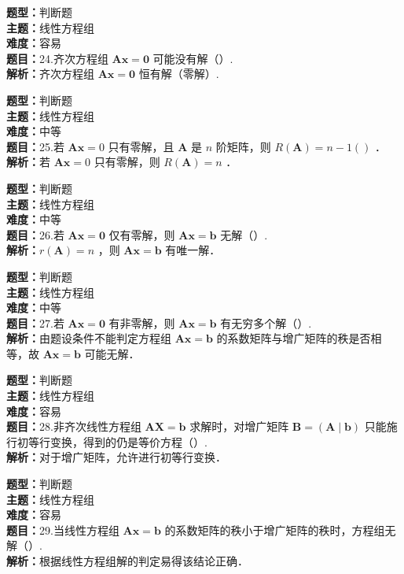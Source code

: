 \documentclass{ctexart}
\newenvironment{question}[5]{%
	\noindent\textbf{题型：}#1\\
	\textbf{主题：}#2\\
	\textbf{难度：}#3\\
	\textbf{题目：}#4\\
	\textbf{解析：}#5\\
	\vspace{1em}
}{}
\begin{document}
	\begin{question}
		{判断题}
		{线性方程组}
		{容易}
		{24.齐次方程组 \(\mathbf{Ax}=\mathbf{0}\) 可能没有解（）. }
		{齐次方程组 \(\mathbf{Ax}=\mathbf{0}\) 恒有解（零解）. }
	\end{question}
	
	\begin{question}
		{判断题}
		{线性方程组}
		{中等}
		{25.若 \(\mathbf{Ax}=0\) 只有零解，且 \(\mathbf{A}\) 是 \(n\) 阶矩阵，则 \(R(\mathbf{A})=n-1()\) ．}
		{若 \(\mathbf{Ax}=0\) 只有零解，则 \(R(\mathbf{A})=n\) ．}
	\end{question}
	
	\begin{question}
		{判断题}
		{线性方程组}
		{中等}
		{26.若 \(\mathbf{Ax}=\mathbf{0}\) 仅有零解，则 \(\mathbf{Ax}=\mathbf{b}\) 无解（）. }
		{\(r(\mathbf{A})=n\) ，则 \(\mathbf{Ax}=\mathbf{b}\) 有唯一解．}
	\end{question}
	
	
	\begin{question}
		{判断题}
		{线性方程组}
		{中等}
		{27.若 \(\mathbf{A x}=\mathbf{0}\) 有非零解，则 \(\mathbf{A x}=\mathbf{b}\) 有无穷多个解（）. }
		{由题设条件不能判定方程组 \(\mathbf{A x}=\mathbf{b}\) 的系数矩阵与增广矩阵的秩是否相等，故 \(\mathbf{A x}=\mathbf{b}\) 可能无解．}
	\end{question}
	
	\begin{question}
		{判断题}
		{线性方程组}
		{容易}
		{28.非齐次线性方程组 \(\mathbf{A X}=\mathbf{b}\) 求解时，对增广矩阵 \(\mathbf{B}=(\mathbf{A} \mid \mathbf{b})\) 只能施行初等行变换，得到的仍是等价方程（）. }
		{对于增广矩阵，允许进行初等行变换．}
	\end{question}
	
	\begin{question}
		{判断题}
		{线性方程组}
		{容易}
		{29.当线性方程组 \(\mathbf{A} \mathbf{x}=\mathbf{b}\) 的系数矩阵的秩小于增广矩阵的秩时，方程组无解（）. }
		{根据线性方程组解的判定易得该结论正确．}
	\end{question}
	
\end{document}
